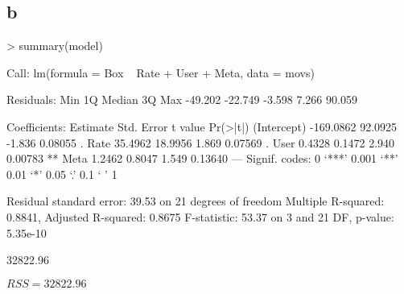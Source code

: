 \documentclass{article}
\begin{document}
\subsection*{b}
\begin{Schunk}
\begin{Sinput}
> summary(model)
\end{Sinput}
\begin{Soutput}
Call:
lm(formula = Box ~ Rate + User + Meta, data = movs)

Residuals:
    Min      1Q  Median      3Q     Max 
-49.202 -22.749  -3.598   7.266  90.059 

Coefficients:
             Estimate Std. Error t value Pr(>|t|)   
(Intercept) -169.0862    92.0925  -1.836  0.08055 . 
Rate          35.4962    18.9956   1.869  0.07569 . 
User           0.4328     0.1472   2.940  0.00783 **
Meta           1.2462     0.8047   1.549  0.13640   
---
Signif. codes:  0 ‘***’ 0.001 ‘**’ 0.01 ‘*’ 0.05 ‘.’ 0.1 ‘ ’ 1

Residual standard error: 39.53 on 21 degrees of freedom
Multiple R-squared:  0.8841,	Adjusted R-squared:  0.8675 
F-statistic: 53.37 on 3 and 21 DF,  p-value: 5.35e-10
\end{Soutput}
\begin{Soutput}
[1] 32822.96
\end{Soutput}
\end{Schunk}
$RSS = 32822.96$
\end{document}
